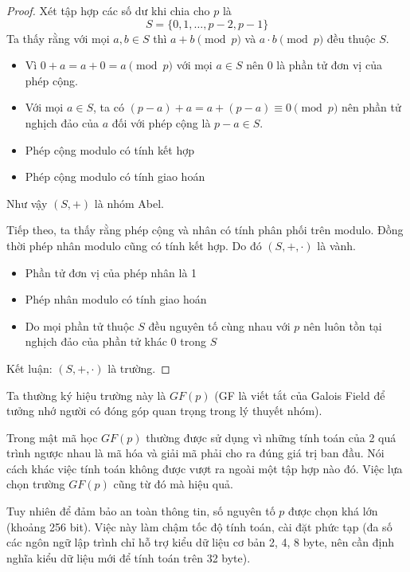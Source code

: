 \begin{proof}
    Xét tập hợp các số dư khi chia cho $p$ là
    \[S = \{0, 1, \ldots, p-2, p-1\}\]
    Ta thấy rằng với mọi $a, b \in S$ thì $a + b \pmod p$ và $a \cdot b \pmod p$ đều thuộc $S$.

    \begin{itemize}[noitemsep]
        \item Vì $0 + a = a + 0 = a \pmod p$ với mọi $a \in S$ nên $0$ là phần tử đơn vị của phép cộng.
        \item Với mọi $a \in S$, ta có $(p-a) + a = a + (p-a) \equiv 0 \pmod p$ nên phần tử nghịch đảo của $a$ 
        đối với phép cộng là $p-a \in S$.
        \item Phép cộng modulo có tính kết hợp
        \item Phép cộng modulo có tính giao hoán
    \end{itemize}
    Như vậy $(S, +)$ là nhóm Abel.

    Tiếp theo, ta thấy rằng phép cộng và nhân có tính phân phối trên modulo.
    Đồng thời phép nhân modulo cũng có tính kết hợp. Do đó $(S, +, \cdot)$ là vành.

    \begin{itemize}[noitemsep]
        \item Phần tử đơn vị của phép nhân là 1
        \item Phép nhân modulo có tính giao hoán
        \item Do mọi phần tử thuộc $S$ đều nguyên tố cùng nhau với $p$ nên luôn tồn tại nghịch đảo của phần tử khác 0 trong $S$
    \end{itemize}
    Kết luận: $(S, +, \cdot)$ là trường.
\end{proof}

Ta thường ký hiệu trường này là $GF(p)$ (GF là viết tắt của Galois Field
để tưởng nhớ người có đóng góp quan trọng trong lý thuyết nhóm).

Trong mật mã học $GF(p)$ thường được sử dụng vì những tính toán 
của 2 quá trình ngược nhau là mã hóa và giải mã phải cho ra đúng
giá trị ban đầu. Nói cách khác việc tính toán không được vượt ra
ngoài một tập hợp nào đó. Việc lựa chọn trường $GF(p)$ cũng từ 
đó mà hiệu quả.

Tuy nhiên để đảm bảo an toàn thông tin, số nguyên tố $p$ được chọn khá lớn
(khoảng 256 bit). Việc này làm chậm tốc độ tính toán, cài đặt phức tạp (đa 
số các ngôn ngữ lập trình chỉ hỗ trợ kiểu dữ liệu cơ bản 2, 4, 8 byte, nên
cần định nghĩa kiểu dữ liệu mới để tính toán trên 32 byte).

